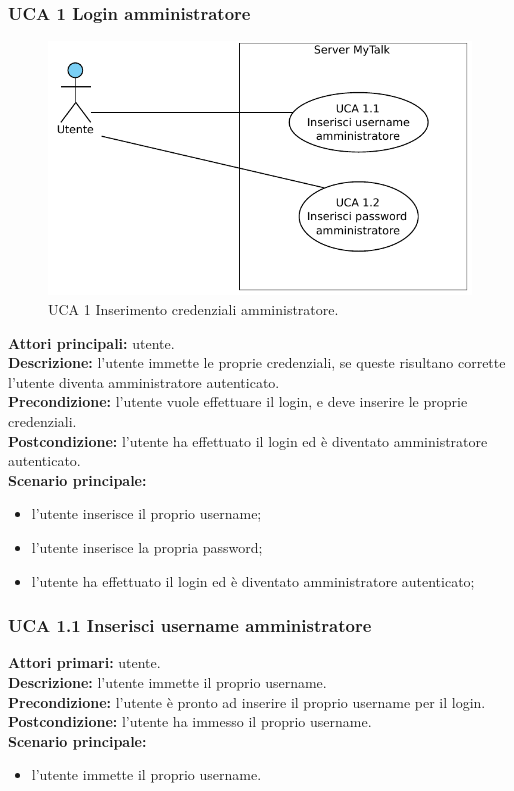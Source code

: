 \newpage

\subsubsection{UCA 1 Login amministratore}

\begin{figure}[htbp]
\centering
\includegraphics[scale=0.8]{./casi_uso/UCA1.pdf}
\caption{UCA 1 Inserimento credenziali amministratore.}
\end{figure}

\noindent 
\textbf{Attori principali:} utente.\\
\textbf{Descrizione:} l'utente immette le proprie credenziali, se queste risultano corrette l'utente diventa amministratore autenticato.\\
\textbf{Precondizione:} l'utente vuole effettuare il login, e deve inserire le proprie credenziali.\\
\textbf{Postcondizione:} l'utente ha effettuato il login ed è diventato amministratore autenticato.\\
\textbf{Scenario principale:}
\begin{itemize}
\item l'utente inserisce il proprio username;
\item l'utente inserisce la propria password;
\item l'utente ha effettuato il login ed è diventato amministratore autenticato;
\end{itemize}

\subsubsection{UCA 1.1 Inserisci username amministratore}
\noindent
\textbf{Attori primari:} utente.\\
\textbf{Descrizione:} l'utente immette il proprio username.\\
\textbf{Precondizione:} l'utente è pronto ad inserire il proprio username per il login.\\
\textbf{Postcondizione:} l'utente ha immesso il proprio username.\\
\textbf{Scenario principale:}
\begin{itemize}
\item l'utente immette il proprio username.
\end{itemize}

